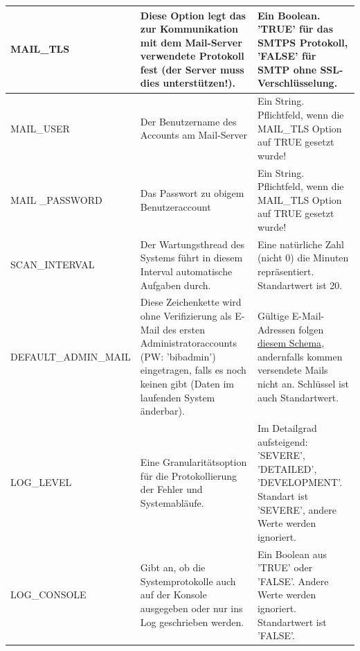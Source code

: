 \documentclass{article}
\begin{document}
\begin{center}
\begin{table}[H]
\begin{tabular} {| m{4cm} | m{6cm} | m{5cm} |}
MAIL\_TLS & Diese Option legt das zur Kommunikation mit dem Mail-Server verwendete Protokoll fest (der Server muss dies unterstützen!). & Ein Boolean. 'TRUE' für das SMTPS Protokoll, 'FALSE' für SMTP ohne SSL-Verschlüsselung.\\ 
\hline
MAIL\_USER & Der Benutzername des Accounts am Mail-Server & Ein String. Pflichtfeld, wenn die MAIL\_TLS Option auf TRUE gesetzt wurde!\\
\hline
MAIL \_PASSWORD & Das Passwort zu obigem Benutzeraccount & Ein String. Pflichtfeld, wenn die MAIL\_TLS Option auf TRUE gesetzt wurde!\\
\hline
SCAN\_INTERVAL & Der Wartungsthread des Systems führt in diesem Interval automatische Aufgaben durch. & Eine natürliche Zahl (nicht 0) die Minuten repräsentiert. Standartwert ist 20. \\
\hline
DEFAULT\_ADMIN\_MAIL & Diese Zeichenkette wird ohne Verifizierung als E-Mail des ersten Administratoraccounts (PW: 'bibadmin') eingetragen, falls es noch keinen gibt (Daten im laufenden System änderbar).  & Gültige E-Mail-Adressen folgen \hyperlink{https://datatracker.ietf.org/doc/html/rfc5322}{diesem Schema}, andernfalls kommen versendete Mails nicht an. Schlüssel ist auch Standartwert.\\
\hline
LOG\_LEVEL & Eine Granularitätsoption für die Protokollierung der Fehler und Systemabläufe. & Im Detailgrad aufsteigend: 'SEVERE', 'DETAILED', 'DEVELOPMENT'. Standart ist 'SEVERE', andere Werte werden ignoriert. \\
\hline
LOG\_CONSOLE & Gibt an, ob die Systemprotokolle auch auf der Konsole ausgegeben oder nur ins Log geschrieben werden. & Ein Boolean aus 'TRUE' oder 'FALSE'. Andere Werte werden ignoriert. Standartwert ist 'FALSE'. \\
\hline
\end{tabular}
\end{table}
\end{center}
\end{document}
